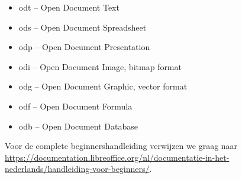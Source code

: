\begin{itemize}
\item {
odt -- Open Document Text}
\item {
ods -- Open Document Spreadsheet}
\item {
odp -- Open Document Presentation}
\item {
odi -- Open Document Image, bitmap format}
\item {
odg -- Open Document Graphic, vector format}
\item {
odf -- Open Document Formula}
\item {
odb -- Open Document Database}
\end{itemize}

Voor de complete beginnershandleiding verwijzen we graag naar \url{https://documentation.libreoffice.org/nl/documentatie-in-het-nederlands/handleiding-voor-beginners/}.
